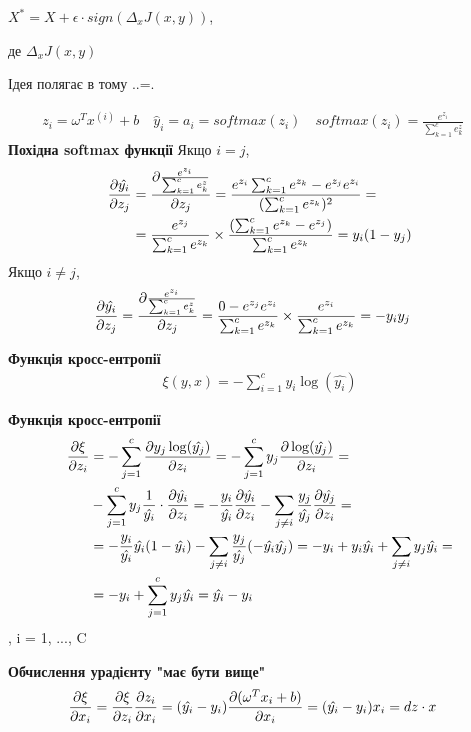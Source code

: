 \documentclass[a4paper,14pt]{extreport}
\newcommand{\tran}{^{T}}
\newcommand{\ith}{^{(i)}}
\begin{document}
	$ X^{*} = X + \epsilon \cdot sign(\Delta_x J(x, y))$, 
	
	де $\Delta_x J(x, y)$
	
	
	Ідея полягає в тому ..=.
	
	\begin{align*}
		z_i = \omega\tran x\ith + b \quad
		\hat{y}_i = a_i = softmax(z_i) \quad
		softmax(z_i) = \frac{e^{z_i}}{\sum_{k=1}^{c} e_k^z} \quad
	\end{align*}
	\textbf{Похідна softmax функції} \newline
	Якщо $i = j$,
	\begin{align*}
	    \pdv{\hat{y_i}}{z_j} 
	    &=
	    \pdv{\frac{e^{z_i}}{\sum_{k=1}^{c} e_k^z}}{z_j} 
	    =
	    \frac{e^{z_i} \sum_{k=1}^{c} e^{z_k} - e^{z_j} e^{z_i}}{(\sum_{k=1}^{c}  e^{z_k})^2} 
	    = \\
	    & =
	    \frac{e^{z_j}}{\sum_{k=1}^{c}  e^{z_k}} \times \frac{(\sum_{k=1}^{c} e^{z_k} - e^{z_j})}{\sum_{k=1}^{c}  e^{z_k}} 
	    = 
	    y_i(1-y_j)
	\end{align*}
	Якщо $i \neq j$,
	\begin{align*}
		\pdv{\hat{y_i}}{z_j}
		&=
		\pdv{\frac{e^{z_i}}{\sum_{k=1}^{c} e_k^z}}{z_j} 
		=
		\frac{0 - e^{z_j} e^{z_i}}{\sum_{k=1}^{c}  e^{z_k}} \times \frac{e^{z_i}}{\sum_{k=1}^{c} e^{z_k}} 
		= 
		-y_i y_j 
	\end{align*}
	
	\textbf{Функція кросс-ентропії}
	\begin{align*}
		\xi(y, x) = - \sum_{i=1}^{c} y_i  \log (\hat{y_i})
	\end{align*}
	
	\textbf{Функція кросс-ентропії}
	\begin{align*}
		\pdv{\xi}{z_i} 
		&= 
		- \sum_{j=1}^{c} \pdv{ y_j \log (\hat{y_j})}{z_i} 
		=
		- \sum_{j=1}^{c} y_j \pdv{ \log (\hat{y_j})}{z_i} 
		= \\&
		- \sum_{j=1}^{c} y_j \frac{1}{\hat{y_i}} \cdot \pdv{\hat{y_i}}{z_i} = 
		- \frac{y_i}{\hat{y_i}} \pdv{\hat{y_i}}{z_i} - \sum_{j \neq i} \frac{y_j}{\hat{y_j}} \pdv{\hat{y_j}}{z_i} 
		= \\& =
		-\frac{y_i}{\hat{y_i}} \hat{y_i} (1 - \hat{y_i}) - \sum_{j \neq i} \frac{y_j}{\hat{y_j}} (-\hat{y_i} \hat{y_j}) 
		=
		-y_i + y_i \hat{y_i} + \sum_{j \neq i} y_j \hat{y_i}
		= \\& =
		-y_i + \sum_{j=1}^{c} y_j \hat{y_i} 
		=
		\hat{y_i} - y_i
	\end{align*}
	, i = 1, ..., C
	
	\textbf{Обчислення урадієнту "має бути вище"}
	\begin{align*}
		\pdv{\xi}{x_i} 
		&=
		\pdv{\xi}{z_i} \pdv{z_i}{x_i} 
		=
		(\hat{y_i} - y_i) \pdv{(\omega\tran x_i+ b)}{x_i} 
		=
		(\hat{y_i} - y_i) x_i 
		=
		dz \cdot x
	\end{align*}
	
\end{document}
